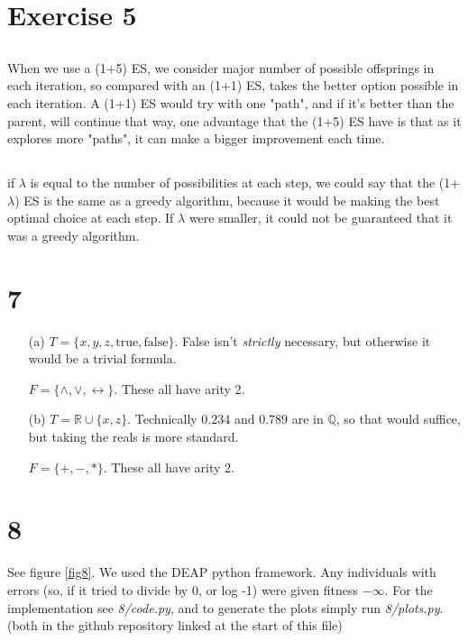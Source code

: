 \documentclass{scrartcl}
\begin{document}
\section{Exercise 5}
\subsection{}
When we use a (1+5) ES, we consider major number of possible offsprings in each iteration, so compared with an (1+1) ES, takes the better option possible in each iteration. A (1+1) ES would try with one "path", and if it's better than the parent, will continue that way, one advantage that the (1+5) ES have is that as it explores more "paths", it can make a bigger improvement each time.
\subsection{}
if $\lambda $ is equal to the number of possibilities at each step, we could say that the (1+$\lambda$) ES is the same as a greedy algorithm, because it would be making the best optimal choice at each step. If $\lambda$ were smaller, it could not be guaranteed that it was a greedy algorithm.


\section*{7}
\begin{itemize}
  \item[(a)]
    $T = \{x, y, z, \text{true}, \text{false}\}$. False isn't
    \emph{strictly} necessary, but otherwise it would be a trivial
    formula.

    $F = \{\land, \lor, \leftrightarrow\}$. These all have arity 2.

  \item[(b)]
    $T = \mathbb{R} \cup \{x, z\}$. Technically $0.234$ and $0.789$ are in
    $\mathbb{Q}$, so that would suffice, but taking the reals is more
    standard.

    $F = \{+, -, *\}$. These all have arity 2.

\end{itemize}

\section*{8}
See figure \ref{fig8}. We used the DEAP python framework. Any individuals with
errors (so, if it tried to divide by 0, or log -1) were given fitness
$-\infty$. For the implementation see \emph{8/code.py}, and to generate
the plots simply run \emph{8/plots.py}. (both in the github repository
linked at the start of this file)
\end{document}
